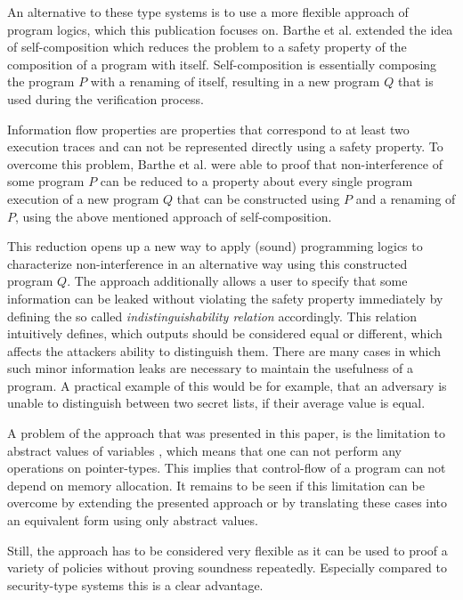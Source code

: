 \documentclass[a4paper,UKenglish]{lipics-v2018}
\begin{document}
An alternative to these type systems is to use a more flexible approach of program logics, which this publication focuses on. Barthe et al. extended the idea of self-composition which reduces the problem to a safety property of the composition of a program with itself. Self-composition is essentially composing the program $P$ with a renaming of itself, resulting in a new program $Q$ that is used during the verification process.
\cite{information_flow_by_self_composition}

Information flow properties are properties that correspond to at least two execution traces and can not be represented directly using a safety property. To overcome this problem, Barthe et al. were able to proof that non-interference of some program $P$ can be reduced to a property about every single program execution of a new program $Q$ that can be constructed using $P$ and a renaming of $P$, using the above mentioned approach of self-composition.
\cite{information_flow_by_self_composition}

This reduction opens up a new way to apply (sound) programming logics to characterize non-interference in an alternative way using this constructed program $Q$. The approach additionally allows a user to specify that some information can be leaked without violating the safety property immediately by defining the so called \textit{indistinguishability relation} accordingly. This relation intuitively defines, which outputs should be considered equal or different, which affects the attackers ability to distinguish them. There are many cases in which such minor information leaks are necessary to maintain the usefulness of a program. A practical example of this would be for example, that an adversary is unable to distinguish between two secret lists, if their average value is equal.
\cite{information_flow_by_self_composition}

A problem of the approach that was presented in this paper, is the limitation to abstract values of variables
\cite{information_flow_by_self_composition}, which means that one can not perform any operations on pointer-types. This implies that control-flow of a program can not depend on memory allocation. It remains to be seen if this limitation can be overcome by extending the presented approach or by translating these cases into an equivalent form using only abstract values.

Still, the approach has to be considered very flexible as it can be used to proof a variety of policies without proving soundness repeatedly. Especially compared to security-type systems this is a clear advantage.
\end{document}

